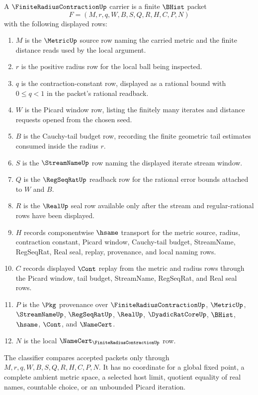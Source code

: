 \begin{definition}
\label{def:finite-radius-contraction-carrier}
A $\FiniteRadiusContractionUp$ carrier is a finite $\BHist$ packet
$$
F=(M,r,q,W,B,S,Q,R,H,C,P,N)
$$
with the following displayed rows:
\begin{enumerate}
\item $M$ is the $\MetricUp$ source row naming the carried metric and the finite distance reads used by the local argument.
\item $r$ is the positive radius row for the local ball being inspected.
\item $q$ is the contraction-constant row, displayed as a rational bound with $0\le q<1$ in the packet's rational readback.
\item $W$ is the Picard window row, listing the finitely many iterates and distance requests opened from the chosen seed.
\item $B$ is the Cauchy-tail budget row, recording the finite geometric tail estimates consumed inside the radius $r$.
\item $S$ is the $\StreamNameUp$ row naming the displayed iterate stream window.
\item $Q$ is the $\RegSeqRatUp$ readback row for the rational error bounds attached to $W$ and $B$.
\item $R$ is the $\RealUp$ seal row available only after the stream and regular-rational rows have been displayed.
\item $H$ records componentwise $\hsame$ transport for the metric source, radius, contraction constant, Picard window, Cauchy-tail budget, StreamName, RegSeqRat, Real seal, replay, provenance, and local naming rows.
\item $C$ records displayed $\Cont$ replay from the metric and radius rows through the Picard window, tail budget, StreamName, RegSeqRat, and Real seal rows.
\item $P$ is the $\Pkg$ provenance over $\FiniteRadiusContractionUp$, $\MetricUp$, $\StreamNameUp$, $\RegSeqRatUp$, $\RealUp$, $\DyadicRatCoreUp$, $\BHist$, $\hsame$, $\Cont$, and $\NameCert$.
\item $N$ is the local $\NameCert_{\FiniteRadiusContractionUp}$ row.
\end{enumerate}
The classifier compares accepted packets only through $M,r,q,W,B,S,Q,R,H,C,P,N$. It has no coordinate for a global fixed point, a complete ambient metric space, a selected host limit, quotient equality of real names, countable choice, or an unbounded Picard iteration.
\end{definition}

